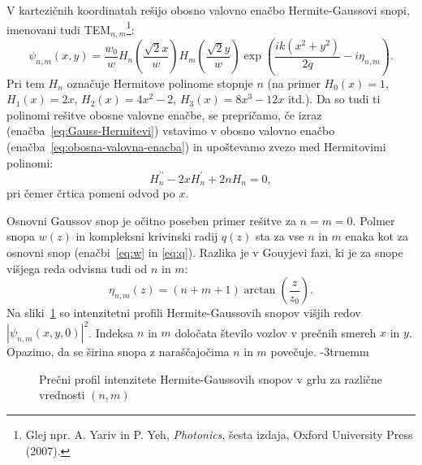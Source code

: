 V kartezičnih koordinatah rešijo obosno valovno enačbo
Hermite-Gaussovi snopi, imenovani tudi 
TEM$_{n,m}$\footnote{Glej npr. A. Yariv in P. Yeh, {\it Photonics}, šesta izdaja, Oxford
University Press (2007).}:
\begin{equation}
\psi_{n,m}(x,y)=\frac{w_{0}}{w}H_{n}\left(\frac{\sqrt{2}x}{w}\right)H_{m}\left(\frac{\sqrt{2}y}{w}\right)
\exp\left(\frac{ik(x^{2}+y^{2})}{2q}-i\eta_{n,m}\right)\!\!.
\label{eq:Gauss-Hermitevi}
\end{equation}
Pri tem $H_{n}$ označuje Hermitove polinome stopnje $n$ (na primer $H_0(x)=1$, $H_1(x)=2x$, 
$H_2(x)=4x^2-2$, $H_3(x)=8x^3-12x$ itd.). 
Da so tudi ti polinomi rešitve obosne valovne enačbe, se 
prepričamo, če izraz (enačba~\ref{eq:Gauss-Hermitevi}) vstavimo v obosno valovno enačbo (enačba~\ref{eq:obosna-valovna-enacba})
in upoštevamo zvezo med Hermitovimi polinomi:
\begin{equation}
H_{n}^{\prime\prime}-2xH_{n}^{\prime}+2nH_{n}=0,
\end{equation}
pri čemer črtica pomeni odvod po $x$. 

Osnovni Gaussov snop je očitno poseben primer rešitve za $n=m=0$.
Polmer snopa $w(z)$ in kompleksni krivinski radij $q(z)$ sta za
vse $n$ in $m$ enaka kot za osnovni snop (enačbi~\ref{eq:w} in \ref{eq:q}). 
Razlika je v Gouyjevi fazi, ki je za snope višjega reda odvisna tudi od $n$ in $m$:
\begin{equation}
\eta_{n,m}\left(z\right)=(n+m+1)\arctan\left(\frac{z}{z_{0}}\right)\!\!.
\end{equation}
Na sliki~\ref{fig:Gauss-Hermitevi-snopi} so intenzitetni profili 
Hermite-Gaussovih snopov višjih redov $|\psi_{n,m}(x, y, 0)|^2$.
Indeksa $n$ in $m$ določata število vozlov v prečnih smereh $x$ in $y$. 
Opazimo, da se širina snopa z naraščajočima $n$ in $m$ povečuje.
\vglue-3truemm
\begin{figure}[ht]
\centering
\def\svgwidth{90truemm} 

\caption{Prečni profil intenzitete Hermite-Gaussovih snopov v grlu 
za različne vrednosti $(n,m)$}
\label{fig:Gauss-Hermitevi-snopi}
\end{figure}

